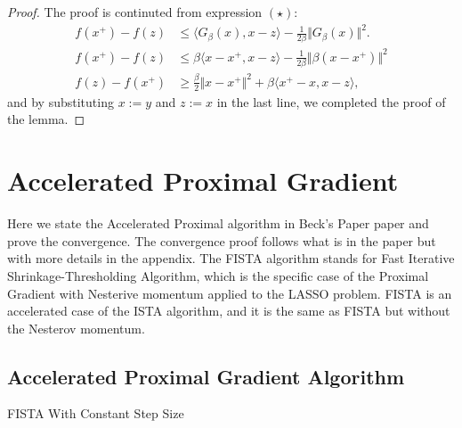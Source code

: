 \documentclass[]{article}
\theoremstyle{definition}
\begin{document}
        \begin{proof}
            The proof is continuted from expression $(\star)$: 
            \begin{align*}
                f(x^+) - f(z) 
                &\le 
                \langle G_\beta(x), x - z\rangle - \frac{1}{2\beta}\Vert G_\beta(x)\Vert^2. 
                \\
                f(x^+) - f(z) & \le 
                \beta\langle x - x^+, x - z\rangle - \frac{1}{2\beta}\Vert \beta (x - x^+)\Vert^2
                \\
                f(z) - f(x^+) & \ge
                \frac{\beta}{2}\Vert x - x^+\Vert^2
                 + 
                \beta\langle x^+ - x, x - z\rangle, 
            \end{align*}
            and by substituting $x:=y$ and $z:= x$ in the last line, we completed the proof of the lemma. 
        \end{proof}

\section{Accelerated Proximal Gradient}\label{sec:apg_intro}
    Here we state the Accelerated Proximal algorithm in Beck's Paper paper\cite{paper:FISTA} and prove the convergence. The convergence proof follows what is in the paper but with more details in the appendix. The FISTA algorithm stands for Fast Iterative Shrinkage-Thresholding Algorithm, which is the specific case of the Proximal Gradient with Nesterive momentum applied to the LASSO problem. FISTA is an accelerated case of the ISTA algorithm, and it is the same as FISTA but without the Nesterov momentum. 
    
    \subsection{Accelerated Proximal Gradient Algorithm} 
        \begin{algorithm}[H]\label{alg:fista_1} 
        \begin{algorithmic}[1]
                \ENDIF
            \ENDFOR
        \end{algorithmic}\caption{FISTA With Constant Step Size}
        \end{algorithm}
\end{document}
